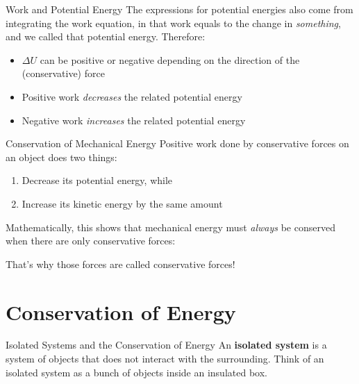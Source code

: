 \documentclass[12pt,compress,aspectratio=169]{beamer}
\newcommand{\eq}[2]{\vspace{#1}{\Large\begin{displaymath}#2\end{displaymath}}}
\begin{document}
\begin{frame}{Work and Potential Energy}
  The expressions for potential energies also come from integrating the work
  equation, in that work equals to the change in \emph{something}, and we
  called that potential energy. Therefore:

  \eq{-.2in}{
    \boxed{
      W_\mathrm{conc.}=-\Delta U
    }
  }
  \begin{itemize}
  \item\vspace{-.15in}$\Delta U$ can be positive or negative depending on the
    direction of the (conservative) force
  \item Positive work \emph{decreases} the related potential energy
  \item Negative work \emph{increases} the related potential energy
  \end{itemize}
\end{frame}



\begin{frame}{Conservation of Mechanical Energy}
  Positive work done by conservative forces on an object does two things:
  \begin{enumerate}[1.]
  \item Decrease its potential energy, while
  \item Increase its kinetic energy by the same amount
  \end{enumerate}
  Mathematically, this shows that mechanical energy must \emph{always} be
  conserved when there are only conservative forces:

  \eq{-.15in}{
    W_\mathrm{conc}=-\Delta U = \Delta K \quad\longrightarrow\quad
    \Delta K + \Delta U =0
  }

  That's why those forces are called conservative forces!
\end{frame}



\section{Conservation of Energy}

\begin{frame}{Isolated Systems and the Conservation of Energy}
  An \textbf{isolated system} is a system of objects that does not interact with
  the surrounding. Think of an isolated system as a bunch of objects inside an
  insulated box.
  \begin{center}
  \end{center}
\end{frame}
\end{document}

